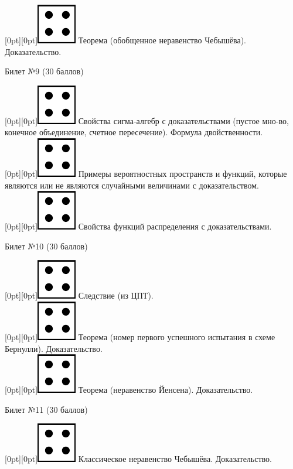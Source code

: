 \documentclass[10pt]{article}
\begin{document}
\raisebox{-1pt}[0pt][0pt]{\includegraphics[width=0.02\linewidth]{4.png}} Теорема (обобщенное неравенство Чебышёва). Доказательство. \\
\begin{center} {\Large Билет №9 (30 баллов)} \end{center}
\raisebox{-1pt}[0pt][0pt]{\includegraphics[width=0.02\linewidth]{4.png}} Свойства сигма-алгебр с доказательствами (пустое мно-во, конечное объединение, счетное пересечение). Формула двойственности. \\
\raisebox{-1pt}[0pt][0pt]{\includegraphics[width=0.02\linewidth]{4.png}} Примеры вероятностных пространств и функций, которые являются или не являются случайными величинами с доказательством. \\
\raisebox{-1pt}[0pt][0pt]{\includegraphics[width=0.02\linewidth]{4.png}} Свойства функций распределения с доказательствами. \\
\begin{center} {\Large Билет №10 (30 баллов)} \end{center}
\raisebox{-1pt}[0pt][0pt]{\includegraphics[width=0.02\linewidth]{4.png}} Следствие (из ЦПТ). \\
\raisebox{-1pt}[0pt][0pt]{\includegraphics[width=0.02\linewidth]{4.png}} Теорема (номер первого успешного испытания в схеме Бернулли). Доказательство. \\
\raisebox{-1pt}[0pt][0pt]{\includegraphics[width=0.02\linewidth]{4.png}} Теорема (неравенство Йенсена). Доказательство. \\
\begin{center} {\Large Билет №11 (30 баллов)} \end{center}
\raisebox{-1pt}[0pt][0pt]{\includegraphics[width=0.02\linewidth]{4.png}} Классическое неравенство Чебышёва. Доказательство. \\
\end{document}

